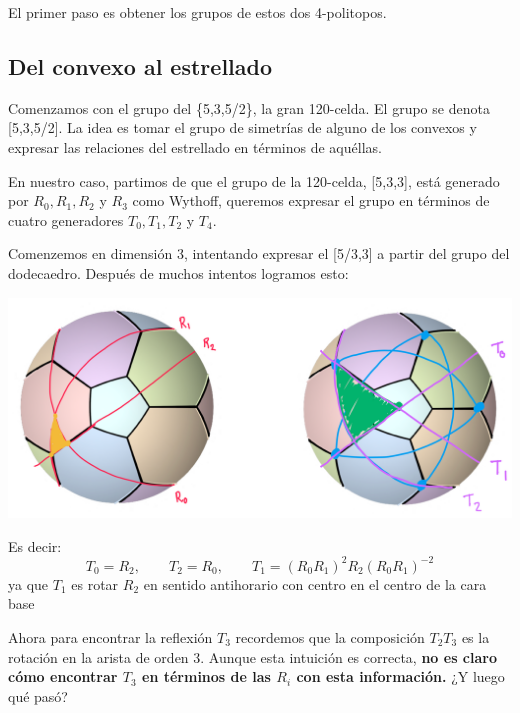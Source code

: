 \documentclass[spanish]{article}
\theoremstyle{definition}
\begin{document}
El primer paso es obtener los grupos de estos dos 4-politopos.

\subsection{Del convexo al estrellado}
Comenzamos con el grupo del \{5,3,5/2\}, la gran 120-celda. El grupo se denota [5,3,5/2]. La idea es tomar el grupo de simetrías de alguno de los convexos y expresar las relaciones del estrellado en términos de aquéllas.

En nuestro caso, partimos de que el grupo de la 120-celda, [5,3,3], está generado por $R_0,R_1,R_2$ y $R_3$ como Wythoff, queremos expresar el grupo en términos de cuatro generadores $T_0,T_1,T_2$ y $T_4$. 

Comenzemos en dimensión 3, intentando expresar el [5/3,3] a partir del grupo del dodecaedro. Después de muchos intentos logramos esto:

\begin{center}
	\includegraphics[width=0.9\linewidth]{politopos1}
\end{center}
Es decir:
\[T_0=R_2,\qquad T_2=R_0,\qquad T_1=(R_0R_1)^2R_2(R_0R_1)^{-2}\]
ya que $T_1$ es rotar $R_2$ en sentido antihorario con centro en el centro de la cara base

Ahora para encontrar la reflexión $T_3$ recordemos que la composición $T_2T_3$ es la rotación en la arista de orden 3. Aunque esta intuición es correcta, \textbf{no es claro cómo encontrar $T_3$ en términos de las $R_i$ con esta información.} ¿Y luego qué pasó?
\end{document}
